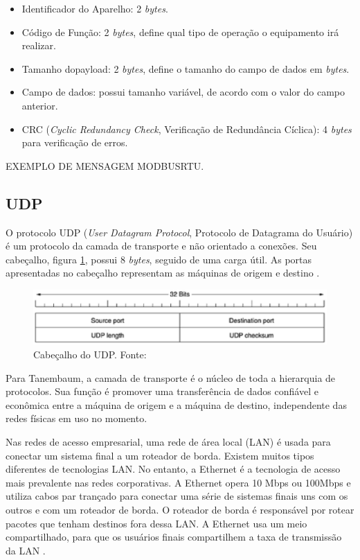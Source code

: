     \begin{itemize}
        \item Identificador do Aparelho: 2 \textit{bytes}.
        \item Código de Função: 2 \textit{bytes}, define qual tipo de operação o equipamento irá realizar.
        \item Tamanho do{payload}: 2 \textit{bytes}, define o tamanho do campo de dados em \textit{bytes}.
        \item Campo de dados: possui tamanho variável, de acordo com o valor do campo anterior.
        \item CRC (\textit{Cyclic Redundancy Check}, Verificação de Redundância Cíclica): 4 \textit{bytes} para verificação de erros.
    \end{itemize}

    EXEMPLO DE MENSAGEM MODBUSRTU.

    \subsection{UDP}
    O protocolo UDP (\textit{User Datagram Protocol}, Protocolo de Datagrama do Usuário) é um protocolo da camada de transporte e não orientado a conexões. Seu cabeçalho, figura \ref{udp_header}, possui 8 \textit{bytes}, seguido de uma carga útil. As portas apresentadas no cabeçalho representam as máquinas de origem e destino \cite{tanenbaum_2002}.

    \begin{figure}[!htpb]
        \centering
        \includegraphics[keepaspectratio=true,scale=0.8]{figuras/udp_header.eps}
        \caption{Cabeçalho do UDP. Fonte: \cite{tanenbaum_2002}}
        \label{udp_header}
    \end{figure}

    Para Tanembaum, a camada de transporte é o núcleo de toda a hierarquia de protocolos. Sua função é promover uma transferência de dados confiável e econômica entre a máquina de origem e a máquina de destino, independente das redes físicas em uso no momento.

    Nas redes de acesso empresarial, uma rede de área local (LAN) é usada para conectar um sistema final a um roteador de borda. Existem muitos tipos diferentes de tecnologias LAN. No entanto, a Ethernet é a tecnologia de acesso mais prevalente nas redes corporativas. A Ethernet opera 10 Mbps ou 100Mbps e utiliza cabos par trançado para conectar uma série de sistemas finais uns com os outros e com um roteador de borda. O roteador de borda é responsável por rotear pacotes que tenham destinos fora dessa LAN. A Ethernet usa um meio compartilhado, para que os usuários finais compartilhem a taxa de transmissão da LAN \cite{kurose_2002}.

